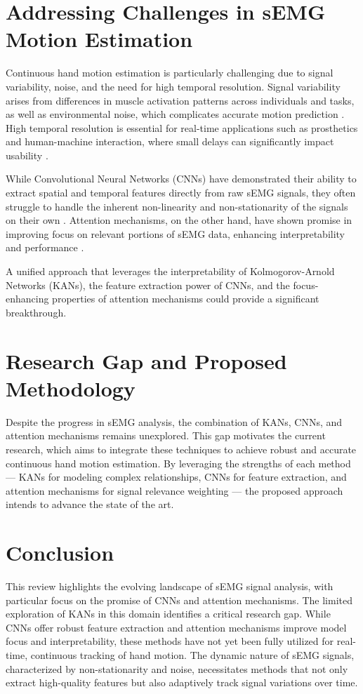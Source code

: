 \section{Addressing Challenges in sEMG Motion Estimation}
Continuous hand motion estimation is particularly challenging due to signal variability, noise, and the need for high temporal resolution. Signal variability arises from differences in muscle activation patterns across individuals and tasks, as well as environmental noise, which complicates accurate motion prediction \cite{farago2022review}. High temporal resolution is essential for real-time applications such as prosthetics and human-machine interaction, where small delays can significantly impact usability \cite{oskoei2007myoelectric}.

While Convolutional Neural Networks (CNNs) have demonstrated their ability to extract spatial and temporal features directly from raw sEMG signals, they often struggle to handle the inherent non-linearity and non-stationarity of the signals on their own \cite{ameri2019regression}. Attention mechanisms, on the other hand, have shown promise in improving focus on relevant portions of sEMG data, enhancing interpretability and performance \cite{zhang2023lstm,lee2022explainable}.

A unified approach that leverages the interpretability of Kolmogorov-Arnold Networks (KANs), the feature extraction power of CNNs, and the focus-enhancing properties of attention mechanisms could provide a significant breakthrough.

\section{Research Gap and Proposed Methodology}
Despite the progress in sEMG analysis, the combination of KANs, CNNs, and attention mechanisms remains unexplored. This gap motivates the current research, which aims to integrate these techniques to achieve robust and accurate continuous hand motion estimation. By leveraging the strengths of each method — KANs for modeling complex relationships, CNNs for feature extraction, and attention mechanisms for signal relevance weighting — the proposed approach intends to advance the state of the art.

\section{Conclusion}
This review highlights the evolving landscape of sEMG signal analysis, with particular focus on the promise of CNNs and attention mechanisms. The limited exploration of KANs in this domain identifies a critical research gap. While CNNs offer robust feature extraction and attention mechanisms improve model focus and interpretability, these methods have not yet been fully utilized for real-time, continuous tracking of hand motion. The dynamic nature of sEMG signals, characterized by non-stationarity and noise, necessitates methods that not only extract high-quality features but also adaptively track signal variations over time.

